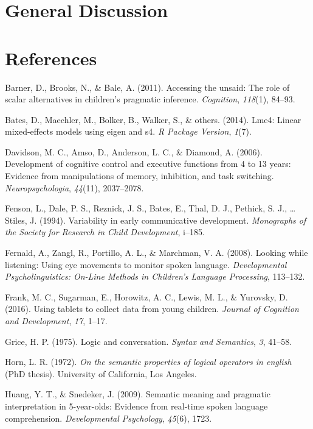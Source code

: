 \documentclass[a4paper,man,apacite,floatsintext]{apa6}
\begin{document}
\section{General Discussion}\label{general-discussion}

\newpage

\section*{References}\label{references}

Barner, D., Brooks, N., \& Bale, A. (2011). Accessing the unsaid: The
role of scalar alternatives in children's pragmatic inference.
\emph{Cognition}, \emph{118}(1), 84--93.

Bates, D., Maechler, M., Bolker, B., Walker, S., \& others. (2014).
Lme4: Linear mixed-effects models using eigen and s4. \emph{R Package
Version}, \emph{1}(7).

Davidson, M. C., Amso, D., Anderson, L. C., \& Diamond, A. (2006).
Development of cognitive control and executive functions from 4 to 13
years: Evidence from manipulations of memory, inhibition, and task
switching. \emph{Neuropsychologia}, \emph{44}(11), 2037--2078.

Fenson, L., Dale, P. S., Reznick, J. S., Bates, E., Thal, D. J.,
Pethick, S. J., \ldots{} Stiles, J. (1994). Variability in early
communicative development. \emph{Monographs of the Society for Research
in Child Development}, i--185.

Fernald, A., Zangl, R., Portillo, A. L., \& Marchman, V. A. (2008).
Looking while listening: Using eye movements to monitor spoken language.
\emph{Developmental Psycholinguistics: On-Line Methods in Children's
Language Processing}, 113--132.

Frank, M. C., Sugarman, E., Horowitz, A. C., Lewis, M. L., \& Yurovsky,
D. (2016). Using tablets to collect data from young children.
\emph{Journal of Cognition and Development}, \emph{17}, 1--17.

Grice, H. P. (1975). Logic and conversation. \emph{Syntax and
Semantics}, \emph{3}, 41--58.

Horn, L. R. (1972). \emph{On the semantic properties of logical
operators in english} (PhD thesis). University of California, Los
Angeles.

Huang, Y. T., \& Snedeker, J. (2009). Semantic meaning and pragmatic
interpretation in 5-year-olds: Evidence from real-time spoken language
comprehension. \emph{Developmental Psychology}, \emph{45}(6), 1723.
\end{document}
